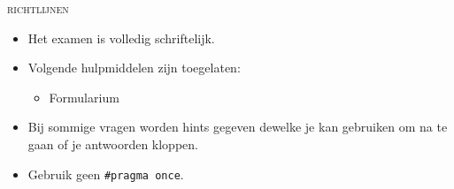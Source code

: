 \usepackage{booktabs}


\newcommand{\cpp}{C++}



\begin{examguidelines}
  \begin{center}
    \textsc{\Huge richtlijnen}
  \end{center}
  \vskip1cm%
  \Large
  \begin{itemize}
    \item Het examen is volledig schriftelijk.
    \item Volgende hulpmiddelen zijn toegelaten:
          \begin{itemize}
            \item Formularium
          \end{itemize}
    \item Bij sommige vragen worden hints gegeven dewelke je kan gebruiken
          om na te gaan of je antwoorden kloppen.
    \item Gebruik geen \verb'#pragma once'.
  \end{itemize}
\end{examguidelines}



























